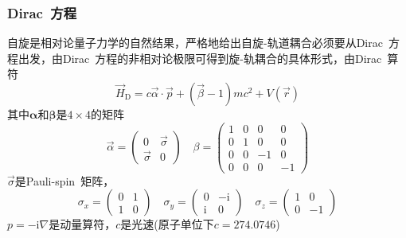 \frame
{
	\frametitle{\textrm{Dirac~}方程}
	自旋是相对论量子力学的自然结果，严格地给出自旋-轨道耦合必须要从\textrm{Dirac~}方程出发，由\textrm{Dirac~}方程的非相对论极限可得到旋-轨耦合的具体形式，由\textrm{Dirac~}算符
	\begin{displaymath}
		\vec H_{\mathrm D}=c\vec{\alpha}\cdot\vec p+(\vec{\beta}-1)mc^2+V(\vec r)
	\end{displaymath}
	其中$\mathbf{\alpha}$和$\mathbf{\beta}$是$4\times4$的矩阵
	\begin{displaymath}
		\vec{\alpha}=\left(
		\begin{matrix}
			0 &\vec{\sigma}\\
			\vec{\sigma} &0
		\end{matrix}
		\right)\quad\beta=\left(
		\begin{matrix}
			1 &0 &0 &0\\
			0 &1 &0 &0\\
			0 &0 &-1 &0\\
			0 &0 &0 &-1
		\end{matrix}
		\right)
	\end{displaymath}
	$\vec{\sigma}$是\textrm{Pauli-spin~}矩阵，
	\begin{displaymath}
		\sigma_x=\left( 
		\begin{matrix}
			0 &1\\
			1 &0
		\end{matrix}
		\right)\quad
		\sigma_y=\left( 
		\begin{matrix}
			0 &-\mathrm{i}\\
			\mathrm{i} &0
		\end{matrix}
		\right)\quad
		\sigma_z=\left( 
		\begin{matrix}
			1 &0\\
			0 &-1
		\end{matrix}
		\right)
	\end{displaymath}
	$p=-\mathrm{i}\nabla$是动量算符，$c$是光速(原子单位下$c=274.0746$)
}

